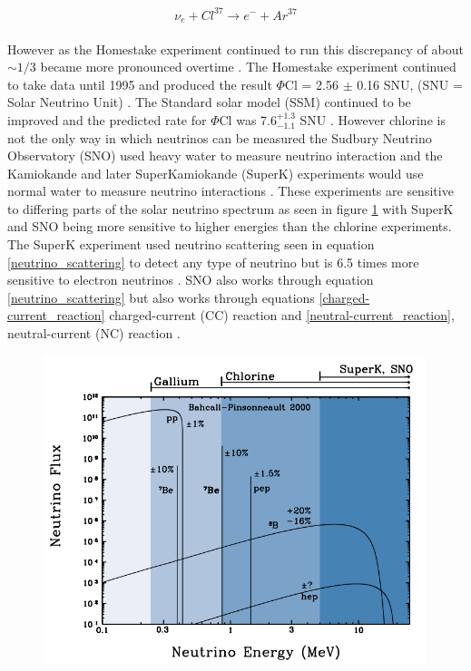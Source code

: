 \begin{equation}
    \nu_e + Cl^{37} \rightarrow  e^- + Ar^{37}
    \label{neutrino_chlorine_decay}
\end{equation}
\\However as the Homestake experiment continued to run this discrepancy of about $\sim 1/3$ became more pronounced overtime . The Homestake experiment continued to take data until 1995 and produced the result $\Phi$Cl = 2.56 $\pm$ 0.16 SNU, (SNU = Solar Neutrino Unit) \cite{Bellerive:2003rj}. The Standard solar model (SSM) continued to be improved and the predicted rate for $\Phi$Cl was 7.6$^{+ 1.3}_{-1.1}$ SNU \cite{Bellerive:2003rj}. However chlorine is not the only way in which neutrinos can be measured the Sudbury Neutrino Observatory (SNO) used heavy water to measure neutrino interaction and the Kamiokande and later SuperKamiokande (SuperK) experiments would use normal water to measure neutrino interactions \cite{Bellerive:2003rj}. These experiments are sensitive to differing parts of the solar neutrino spectrum as seen in figure \ref{neutrino_emmision_graph} with SuperK and SNO being more sensitive to higher energies than the chlorine experiments. The SuperK experiment used neutrino scattering seen in equation \ref{neutrino_scattering} to detect any type of neutrino but is 6.5 times more sensitive to electron neutrinos \cite{griffiths2008book} \cite{griffiths2008neutrinoOscillations}. SNO also works through equation \ref{neutrino_scattering} but also works through equations \ref{charged-current_reaction} charged-current (CC) reaction  and \ref{neutral-current_reaction}, neutral-current (NC) reaction \cite{sno2001}\cite{Bellerive:2003rj} \cite{griffiths2008book} \cite{griffiths2008neutrinoOscillations}. 
\begin{figure}[htbp]
 \centering
 \includegraphics[height=90mm]{Chapter1/Figs/Raster/neutrino_emmision_graph.png}
 \label{neutrino_emmision_graph}
\end{figure}
